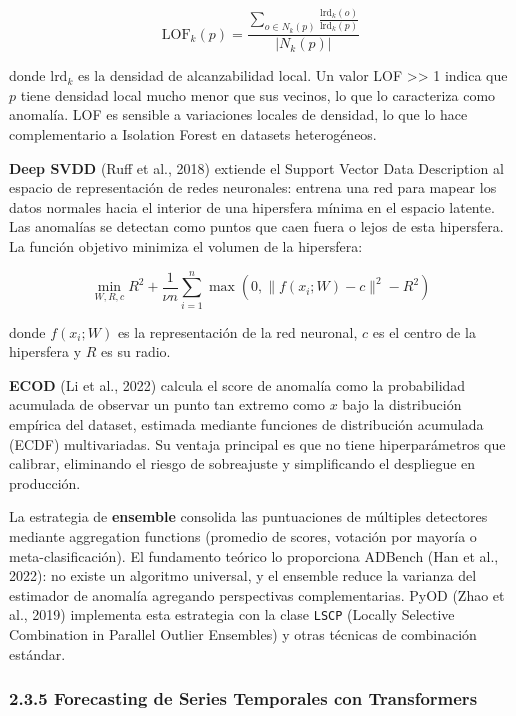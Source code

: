 \[\text{LOF}_k(p) = \frac{\sum_{o \in N_k(p)} \frac{\text{lrd}_k(o)}{\text{lrd}_k(p)}}{|N_k(p)|}\]

donde \(\text{lrd}_k\) es la densidad de alcanzabilidad local. Un valor
LOF \textgreater\textgreater{} 1 indica que \(p\) tiene densidad local
mucho menor que sus vecinos, lo que lo caracteriza como anomalía. LOF es
sensible a variaciones locales de densidad, lo que lo hace
complementario a Isolation Forest en datasets heterogéneos.

\textbf{Deep SVDD} (Ruff et al., 2018) extiende el Support Vector Data
Description al espacio de representación de redes neuronales: entrena
una red para mapear los datos normales hacia el interior de una
hipersfera mínima en el espacio latente. Las anomalías se detectan como
puntos que caen fuera o lejos de esta hipersfera. La función objetivo
minimiza el volumen de la hipersfera:

\[\min_{W, R, c} R^2 + \frac{1}{\nu n} \sum_{i=1}^{n} \max(0, \|f(x_i; W) - c\|^2 - R^2)\]

donde \(f(x_i; W)\) es la representación de la red neuronal, \(c\) es el
centro de la hipersfera y \(R\) es su radio.

\textbf{ECOD} (Li et al., 2022) calcula el score de anomalía como la
probabilidad acumulada de observar un punto tan extremo como \(x\) bajo
la distribución empírica del dataset, estimada mediante funciones de
distribución acumulada (ECDF) multivariadas. Su ventaja principal es que
no tiene hiperparámetros que calibrar, eliminando el riesgo de
sobreajuste y simplificando el despliegue en producción.

La estrategia de \textbf{ensemble} consolida las puntuaciones de
múltiples detectores mediante aggregation functions (promedio de scores,
votación por mayoría o meta-clasificación). El fundamento teórico lo
proporciona ADBench (Han et al., 2022): no existe un algoritmo
universal, y el ensemble reduce la varianza del estimador de anomalía
agregando perspectivas complementarias. PyOD (Zhao et al., 2019)
implementa esta estrategia con la clase \texttt{LSCP} (Locally Selective
Combination in Parallel Outlier Ensembles) y otras técnicas de
combinación estándar.

\subsubsection{2.3.5 Forecasting de Series Temporales con
Transformers}\label{forecasting-de-series-temporales-con-transformers}

